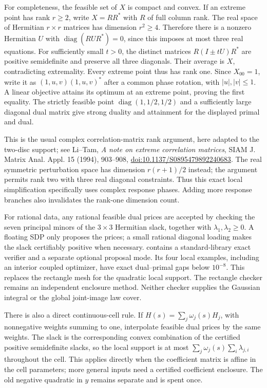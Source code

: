 For completeness, the feasible set of $X$ is compact and convex. If an extreme
point has rank $r\ge2$, write $X=RR^*$ with $R$ of full column rank. The real
space of Hermitian $r\times r$ matrices has dimension $r^2\ge4$. Therefore
there is a nonzero Hermitian $U$ with
$\operatorname{diag}(RUR^*)=0$, since this imposes at most three real equations.
For sufficiently small $t>0$, the distinct matrices
$R(I\pm tU)R^*$ are positive semidefinite and preserve all three diagonals.
Their average is $X$, contradicting extremality. Every extreme point thus has
rank one. Since $X_{00}=1$, write it as $(1,u,v)(1,u,v)^*$ after a common phase
rotation, with $|u|,|v|\le1$. A linear objective attains its optimum at an
extreme point, proving the first equality. The strictly feasible point
$\operatorname{diag}(1,1/2,1/2)$ and a sufficiently large diagonal dual matrix
give strong duality and attainment for the displayed primal and dual.

This is the usual complex correlation-matrix rank argument, here adapted to
the two-disc support; see Li--Tam, \emph{A note on extreme correlation matrices},
SIAM J. Matrix Anal. Appl. 15 (1994), 903--908,
\href{https://doi.org/10.1137/S0895479892240683}{doi:10.1137/S0895479892240683}.
The real symmetric perturbation space has dimension $r(r+1)/2$ instead;
the argument permits rank two with three real diagonal constraints. Thus this
exact local simplification specifically uses complex response phases. Adding
more response branches also invalidates the rank-one dimension count.

For rational data, any rational feasible dual prices are accepted by checking
the seven principal minors of the $3\times3$ Hermitian slack, together with
$\lambda_1,\lambda_2\ge0$. A floating SDP only proposes the prices; a small
rational diagonal loading makes the slack certifiably positive when necessary.
 contains a standard-library exact verifier and
a separate optional proposal mode. Its four local examples, including an
interior coupled optimizer, have exact dual--primal gaps below $10^{-8}$.
This replaces the rectangle mesh for the quadratic local support. The rectangle
checker remains an independent enclosure method. Neither checker supplies the
Gaussian integral or the global joint-image law cover.

There is also a direct continuous-cell rule. If
$H(s)=\sum_j\omega_j(s)H_j$, with nonnegative weights summing to one, interpolate
feasible dual prices by the same weights. The slack is the corresponding
convex combination of the certified positive semidefinite slacks, so the local
support is at most $\sum_j\omega_j(s)\sum_i\lambda_{j,i}$ throughout the cell.
This applies directly when the coefficient matrix is affine in the cell
parameters; more general inputs need a certified coefficient enclosure.
The old negative quadratic in $y$ remains separate and is spent once.

